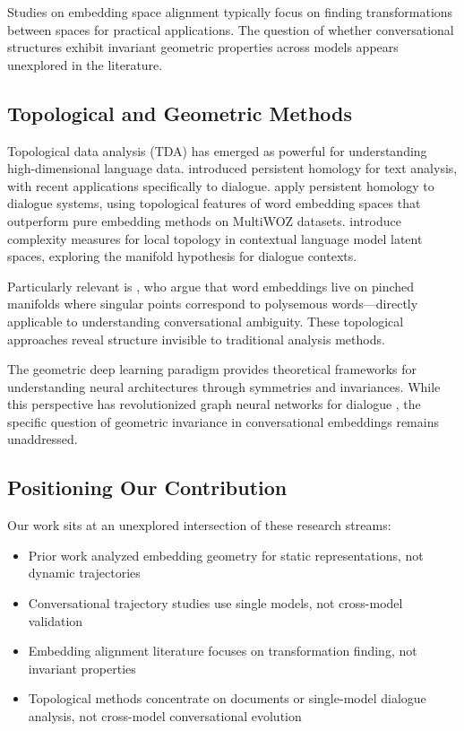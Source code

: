 \documentclass[11pt,letterpaper]{article}
\begin{document}
Studies on embedding space alignment typically focus on finding transformations between spaces \citep{conneau2018word} for practical applications. The question of whether conversational structures exhibit invariant geometric properties across models appears unexplored in the literature.

\subsection{Topological and Geometric Methods}

Topological data analysis (TDA) has emerged as powerful for understanding high-dimensional language data. \citet{zhu2013persistent} introduced persistent homology for text analysis, with recent applications specifically to dialogue. \citet{vukovic2022dialogue} apply persistent homology to dialogue systems, using topological features of word embedding spaces that outperform pure embedding methods on MultiWOZ datasets. \citet{ruppik2024topology} introduce complexity measures for local topology in contextual language model latent spaces, exploring the manifold hypothesis for dialogue contexts.

Particularly relevant is \citet{jakubowski2020topology}, who argue that word embeddings live on pinched manifolds where singular points correspond to polysemous words—directly applicable to understanding conversational ambiguity. These topological approaches reveal structure invisible to traditional analysis methods.

The geometric deep learning paradigm \citep{bronstein2021geometric} provides theoretical frameworks for understanding neural architectures through symmetries and invariances. While this perspective has revolutionized graph neural networks for dialogue \citep{ghosal2019dialoguegcn}, the specific question of geometric invariance in conversational embeddings remains unaddressed.

\subsection{Positioning Our Contribution}

Our work sits at an unexplored intersection of these research streams:

\begin{itemize}
\item Prior work analyzed embedding geometry for static representations, not dynamic trajectories
\item Conversational trajectory studies use single models, not cross-model validation
\item Embedding alignment literature focuses on transformation finding, not invariant properties
\item Topological methods concentrate on documents or single-model dialogue analysis, not cross-model conversational evolution
\end{itemize}
\end{document}
